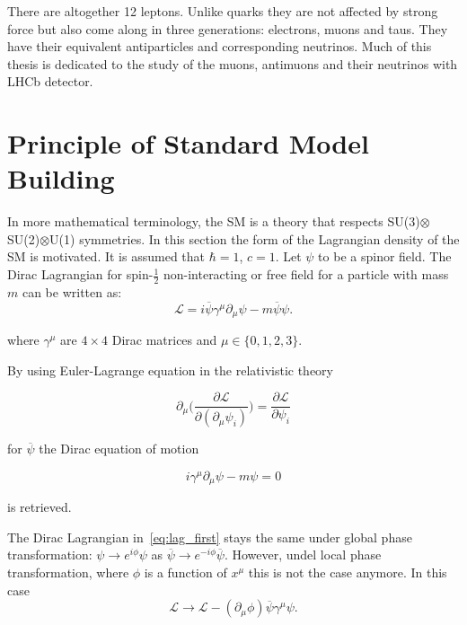 There are altogether 12 leptons. Unlike quarks they are not affected by strong force but also come along in three generations: electrons, muons and taus. They have their equivalent antiparticles and corresponding neutrinos. Much of this thesis is dedicated to the study of the muons, antimuons and their neutrinos with LHCb detector.


\section{Principle of Standard Model Building}
In more mathematical terminology, the SM is a theory that respects SU(3)$\otimes$SU(2)$\otimes$U(1) symmetries. In this section the form of the Lagrangian density of the SM is motivated. It is assumed that $\hbar=1$, $c=1$. Let $\psi$ to be a spinor field. The Dirac Lagrangian for spin-$\frac{1}{2}$ non-interacting or free field for a particle with mass $m$ can be written as: 
\begin{equation}
\mathcal{L} = i\overline{\psi}\gamma^{\mu}\partial_{\mu}\psi - m\overline{\psi}\psi.
\label{eq:lag_first}
\end{equation}

where $\gamma^{\mu}$ are $4\times 4$ Dirac matrices and $\mu\in\{0,1,2,3\}$.

By using Euler-Lagrange equation in the relativistic theory

\begin{equation}
	\partial_{\mu}\Big(\frac{\partial{\mathcal{L}}}{\partial(\partial_{\mu}\psi_{i})} \Big) =\frac{\partial \mathcal{L}}{\partial\psi_{i}}
\label{eq:lag_first}
\end{equation}

for $\overline\psi$ the Dirac equation of motion

\begin{equation}
 i\gamma^{\mu}\partial_{\mu}\psi - m\psi = 0
\label{eq:lag_first}
\end{equation}

is retrieved.

The Dirac Lagrangian in~\autoref{eq:lag_first} stays the same under global phase transformation: $\psi \rightarrow e^{i\phi}\psi$ as $\overline\psi \rightarrow e^{-i\phi}\overline\psi$. However, undel local phase transformation, where $\phi$ is a function of $x^{\mu}$  this is not the case anymore. In this case
\begin{equation}
\mathcal{L} \rightarrow \mathcal{L}- (\partial_{\mu}\phi) \overline{\psi}\gamma^{\mu}\psi.
\label{eq:notinv}
\end{equation}


